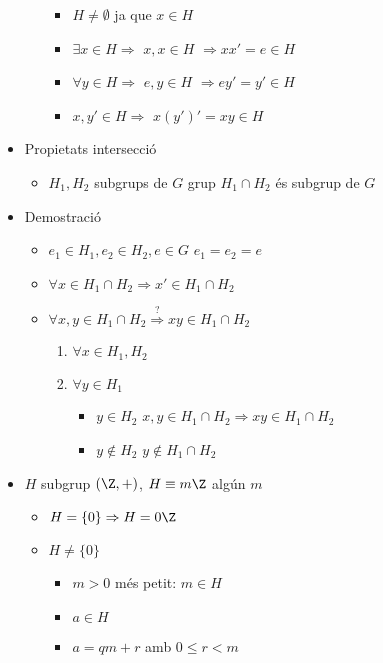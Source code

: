 \begin{itemize}
\begin{itemize}
		\begin{itemize}
		\item $H \neq \emptyset$ ja que $x \in H$
		\item $\exists x \in H \Rightarrow$ $x, x \in H$ $\Rightarrow xx' = e \in H$
		\item $\forall y \in H \Rightarrow$ $e, y \in H$ $\Rightarrow ey' = y' \in H$
		\item $x, y' \in H \Rightarrow$ $x(y')' = xy \in H$
		\end{itemize}
	\end{itemize}
\item Propietats intersecció
	\begin{itemize}
	\item $H_1, H_2$ subgrups de $G$ grup
		\subitem $H_1 \cap H_2$ és subgrup de $G$
	\end{itemize}
\item Demostració
	\begin{itemize}
	\item $e_1 \in H_1, e_2 \in H_2, e \in G$
		\subitem $e_1 = e_2 = e$
	\item $\forall x \in H_1 \cap H_2 \Rightarrow x' \in H_1 \cap H_2$
	\item $\forall x, y \in H_1 \cap H_2 \overset{?}{\Rightarrow} xy \in H_1 \cap H_2$
		\begin{enumerate}
		\item $\forall x \in H_1, H_2$
		\item $\forall y \in H_1$
			\begin{itemize}
			\item $y \in H_2$
				\subitem $x, y \in H_1 \cap H_2 \Rightarrow xy \in H_1 \cap H_2$
			\item $y \notin H_2$
				\subitem $y \notin H_1 \cap H_2$
			\end{itemize}
		\end{enumerate}
	\end{itemize}
\item $H$ subgrup $(\Z, +)$, $H \equiv m\Z$ algún $m$
	\begin{itemize}
	\item $H = \{0\} \Rightarrow H = 0 \Z$
	\item $H \neq \{0\}$
		\begin{itemize}
		\item $m > 0$ més petit: $m \in H$
		\item $a \in H$
		\item $a = qm + r$ amb $0 \le r < m$
			\begin{itemize}

\end{itemize}
\end{itemize}
\end{itemize}
\end{itemize}
